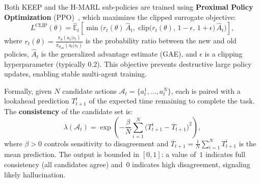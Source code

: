 
Both KEEP and the H-MARL sub-policies are trained using
\textbf{Proximal Policy Optimization} (PPO)~\cite{arXiv:1707.06347},
which maximizes the clipped surrogate objective:
\begin{equation}
\label{eq:ppo}
  L^{\text{CLIP}}(\theta) = \hat{\mathbb{E}}_t\!\left[
    \min\!\bigl(
      r_t(\theta)\,\hat{A}_t,\;
      \text{clip}\bigl(r_t(\theta),\, 1{-}\epsilon,\, 1{+}\epsilon\bigr)\,
      \hat{A}_t
    \bigr)
  \right],
\end{equation}
where $r_t(\theta) = \frac{\pi_\theta(a_t|s_t)}{\pi_{\theta_{\text{old}}}(a_t|s_t)}$
is the probability ratio between the new and old policies,
$\hat{A}_t$ is the generalized advantage estimate (GAE),
and $\epsilon$ is a clipping hyperparameter (typically $0.2$).
This objective prevents destructive large policy updates,
enabling stable multi-agent training.


%


Formally, given $N$ candidate actions
$\mathcal{A}_t = \{a^1_t, \ldots, a^N_t\}$,
each is paired with a lookahead prediction $T^i_{t+1}$ of the
expected time remaining to complete the task.
The \textbf{consistency} of the candidate set is:
\begin{equation}
\label{eq:consistency}
  \lambda(\mathcal{A}_t) = \exp\!\left(
    -\frac{\beta}{N}\sum_{i=1}^{N}
    \bigl(T^i_{t+1} - \overline{T}_{t+1}\bigr)^2
  \right),
\end{equation}
where $\beta > 0$ controls sensitivity to disagreement and
$\overline{T}_{t+1} = \frac{1}{N}\sum_{i=1}^{N} T^i_{t+1}$
is the mean prediction.
The output is bounded in $[0,1]$: a value of~$1$ indicates
full consistency (all candidates agree) and~$0$ indicates
high disagreement, signaling likely hallucination.


